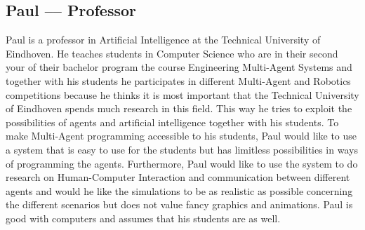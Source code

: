 \subsection{Paul –-- Professor}
Paul is a professor in Artificial Intelligence at the Technical University of Eindhoven. He teaches students in Computer Science who are in their second your of their bachelor program the course Engineering Multi-Agent Systems and together with his students he participates in different Multi-Agent and Robotics competitions because he thinks it is most important that the Technical University of Eindhoven spends much research in this field. This way he tries to exploit the possibilities of agents and artificial intelligence together with his students. 
To make Multi-Agent programming accessible to his students, Paul would like to use a system that is easy to use for the students but has limitless possibilities in ways of programming the agents. Furthermore, Paul would like to use the system to do research on Human-Computer Interaction and communication between different agents and would he like the simulations to be as realistic as possible concerning the different scenarios but does not value fancy graphics and animations. Paul is good with computers and assumes that his students are as well.
